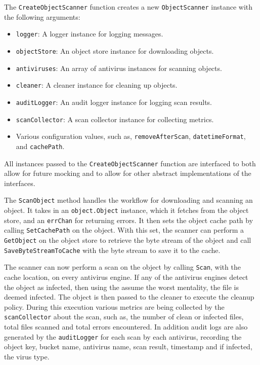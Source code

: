 \documentclass[12pt, conference, final, a4paper, onecolumn, compsoc]{IEEEtran}
\begin{document}
The \texttt{CreateObjectScanner} function creates a new \texttt{ObjectScanner}
instance with the following arguments:

\medskip
\begin{itemize}
  \item \texttt{logger}: A logger instance for logging messages.
  \item \texttt{objectStore}: An object store instance for downloading objects.
  \item \texttt{antiviruses}: An array of antivirus instances for scanning
        objects.
  \item \texttt{cleaner}: A cleaner instance for cleaning up objects.
  \item \texttt{auditLogger}: An audit logger instance for logging scan results.
  \item \texttt{scanCollector}: A scan collector instance for collecting
        metrics.
  \item Various configuration values, such as, \texttt{removeAfterScan},
        \texttt{datetimeFormat}, and \texttt{cachePath}.
\end{itemize}

All instances passed to the \texttt{CreateObjectScanner} function are interfaced
to both allow for future mocking and to allow for other abstract implementations
of the interfaces.


The \texttt{ScanObject} method handles the workflow for downloading and scanning
an object. It takes in an \texttt{object.Object} instance, which it fetches from
the object store, and an \texttt{errChan} for returning errors. It then sets the
object cache path by calling \texttt{SetCachePath} on the object. With this set,
the scanner can perform a \texttt{GetObject} on the object store to retrieve the
byte stream of the object and call \texttt{SaveByteStreamToCache} with the byte
stream to save it to the cache.

The scanner can now perform a scan on the object by calling \texttt{Scan}, with
the cache location, on every antivirus engine. If any of the antivirus engines
detect the object as infected, then using the assume the worst mentality, the
file is deemed infected. The object is then passed to the cleaner to execute the
cleanup policy. During this execution various metrics are being collected by the
\texttt{scanCollector} about the scan, such as, the number of clean or infected
files, total files scanned and total errors encountered. In addition audit logs
are also generated by the \texttt{auditLogger} for each scan by each antivirus,
recording the object key, bucket name, antivirus name, scan result, timestamp
and if infected, the virus type.
\end{document}
